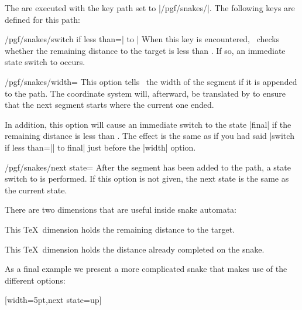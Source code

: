 \begin{command}{\pgfdeclaresnake{}}
\begin{command}{\state{}}
    The  are executed with the key path set to
    |/pgf/snakes/|. The following keys are defined for this path: 
    \begin{key}{/pgf/snakes/switch if less than=| to |}
      When this key is encountered, \pgfname\ checks whether the
      remaining distance to the target is less than
      . If so, an immediate state switch to  occurs.
    \end{key}
    \begin{key}{/pgf/snakes/width=}
      This option tells \pgfname\ the width of the segment if it is
      appended to the path. The coordinate system will, afterward, be
      translated by  to ensure that the next segment
      starts where the current one ended.

      In addition, this option will cause an immediate switch to the
      state |final| if the remaining distance is less than
      . The effect is the same as if you had said
      |switch if less than=|| to final| just before
      the |width| option.
    \end{key}
    \begin{key}{/pgf/snakes/next state=}
      After the segment has been added to the path, a state switch to
       is performed. If this option is not given, the
      next state is the same as the current state.
    \end{key}
  
    There are two dimensions that are useful inside snake automata:
    \begin{command}{\pgfsnakeremainingdistance}
      This \TeX\ dimension holds the remaining distance to the target.
    \end{command}
    \begin{command}{\pgfsnakecompleteddistance}
      This \TeX\ dimension holds the distance already completed on the
      snake. 
    \end{command}
  \end{command}

  As a final example we present a more complicated snake that makes
  use of the different options:
\begin{codeexample}[]
{
  [width=5pt,next state=up]
  { \pgfpathlineto{\pgfpoint{5pt}{0pt}} }
  
}
\end{codeexample}
\end{command}

